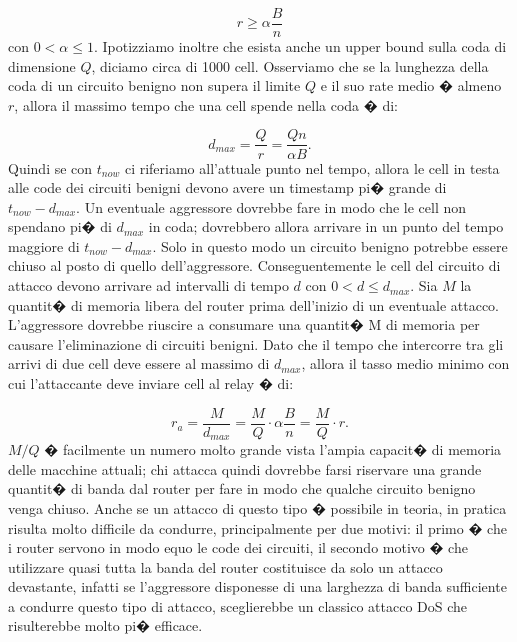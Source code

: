 \begin{equation}
r\ge \alpha \frac{B}{n}
\end{equation}
con $0<\alpha \le1$.
Ipotizziamo inoltre che esista anche un upper bound sulla coda di dimensione $Q$, diciamo circa di 1000 cell. Osserviamo che se la lunghezza della coda di un circuito benigno non supera il limite $Q$ e il suo rate medio � almeno $r$, allora il massimo tempo che una cell spende nella coda � di:

\begin{equation}
d_{max}=\frac{Q}{r}=\frac{Qn}{\alpha B}.
\end{equation}
Quindi se con $t_{now}$ ci riferiamo all'attuale punto nel tempo, allora le cell in testa alle code dei circuiti benigni devono avere un timestamp pi� grande di $t_{now}-d_{max}$. Un eventuale aggressore dovrebbe fare in modo che le cell non spendano pi� di $d_{max}$ in coda; dovrebbero allora arrivare in un punto del tempo maggiore di $t_{now}-d_{max}$. Solo in questo modo un circuito benigno potrebbe essere chiuso al posto di quello dell'aggressore. Conseguentemente le cell del circuito di attacco devono arrivare ad intervalli di tempo $d$ con $0< d \le d_{max}$. Sia $M$ la quantit� di memoria libera del router prima dell'inizio di un eventuale attacco. L'aggressore dovrebbe riuscire a consumare una quantit� M di memoria per causare l'eliminazione di circuiti benigni. Dato che il tempo che intercorre tra gli arrivi di due cell deve essere al massimo di $d_{max}$, allora il tasso medio minimo con cui l'attaccante deve inviare cell al relay � di:

\begin{equation}
r_a=\frac{M}{d_{max}}=\frac{M}{Q} \cdot \alpha \frac{B}{n}=\frac{M}{Q} \cdot r.
\end{equation}
$M/Q$ � facilmente un numero molto grande vista l'ampia capacit� di memoria delle macchine attuali; chi attacca quindi dovrebbe farsi riservare una grande quantit� di banda dal router per fare in modo che qualche circuito benigno venga chiuso. Anche se un attacco di questo tipo � possibile in teoria, in pratica risulta molto difficile da condurre, principalmente per due motivi:
il primo � che i router servono in modo equo le code dei circuiti, il secondo motivo � che utilizzare quasi tutta la banda del router costituisce da solo un attacco devastante, infatti se l'aggressore disponesse di una larghezza di banda sufficiente a condurre questo tipo di attacco, sceglierebbe un classico attacco DoS che risulterebbe molto pi� efficace.


